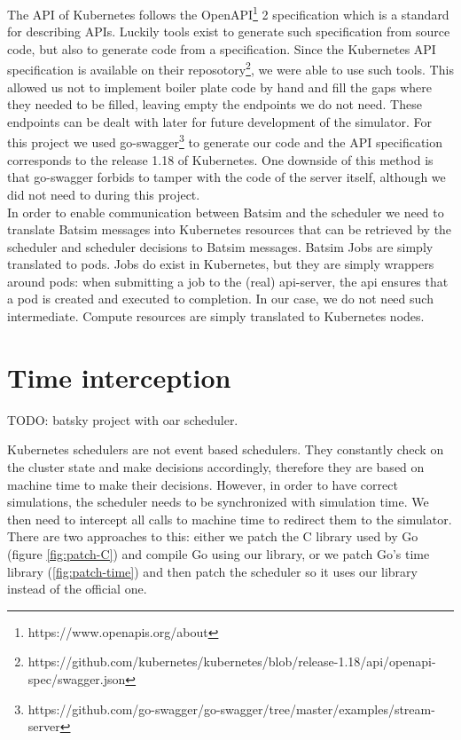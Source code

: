 The API of Kubernetes follows the
OpenAPI\footnote{https://www.openapis.org/about} 2 specification which is a
standard for describing APIs. Luckily tools exist to generate such
specification from source code, but also to generate code from a specification.
Since the Kubernetes API specification is available on their
reposotory\footnote{https://github.com/kubernetes/kubernetes/blob/release-1.18/api/openapi-spec/swagger.json},
we were able to use such tools. This allowed us not to implement boiler plate
code by hand and fill the gaps where they needed to be filled, leaving empty
the endpoints we do not need. These endpoints can be dealt with later for
future development of the simulator. For this project we used
go-swagger\footnote{https://github.com/go-swagger/go-swagger/tree/master/examples/stream-server}
to generate our code and the API specification corresponds to the release 1.18
of Kubernetes. One downside of this method is that go-swagger forbids to tamper
with the code of the server itself, although we did not need to during this
project.\\

In order to enable communication between Batsim and the scheduler we need to
translate Batsim messages into Kubernetes resources that can be retrieved by
the scheduler and scheduler decisions to Batsim messages. Batsim Jobs are
simply translated to pods. Jobs do exist in Kubernetes, but they are simply
wrappers around pods: when submitting a job to the (real) api-server, the api
ensures that a pod is created and executed to completion. In our case, we do
not need such intermediate. Compute resources are simply translated to
Kubernetes nodes.

\section{Time interception} \label{sec:time-hijack}

TODO: batsky project with oar scheduler.

Kubernetes schedulers are not event based schedulers. They constantly check on
the cluster state and make decisions accordingly, therefore they are based on
machine time to make their decisions. However, in order to have correct
simulations, the scheduler needs to be synchronized with simulation time. We
then need to intercept all calls to machine time to redirect them to the
simulator. There are two approaches to this: either we patch the C library used
by Go (figure \ref{fig:patch-C}) and compile Go using our library, or we patch
Go's time library (\ref{fig:patch-time}) and then patch the scheduler so it uses
our library instead of the official one.

